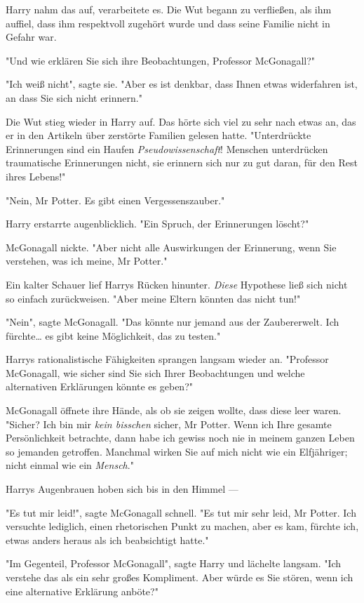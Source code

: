 {Harry nahm das auf, verarbeitete es. Die Wut begann zu verfließen, als ihm auffiel, dass ihm respektvoll zugehört wurde und dass seine Familie nicht in Gefahr war.

"Und wie erklären Sie sich ihre Beobachtungen, Professor McGonagall?"

"Ich weiß nicht", sagte sie. "Aber es ist denkbar, dass Ihnen etwas widerfahren ist, an dass Sie sich nicht erinnern."

Die Wut stieg wieder in Harry auf. Das hörte sich viel zu sehr nach etwas an, das er in den Artikeln über zerstörte Familien gelesen hatte. "Unterdrückte Erinnerungen sind ein Haufen \emph{Pseudowissenschaft}! Menschen unterdrücken traumatische Erinnerungen nicht, sie erinnern sich nur zu gut daran, für den Rest ihres Lebens!"

"Nein, Mr Potter. Es gibt einen Vergessenszauber."

Harry erstarrte augenblicklich. "Ein Spruch, der Erinnerungen löscht?"

McGonagall nickte. "Aber nicht alle Auswirkungen der Erinnerung, wenn Sie verstehen, was ich meine, Mr Potter."

Ein kalter Schauer lief Harrys Rücken hinunter. \emph{Diese} Hypothese ließ sich nicht so einfach zurückweisen. "Aber meine Eltern könnten das nicht tun!"

"Nein", sagte McGonagall. "Das könnte nur jemand aus der Zaubererwelt. Ich fürchte… es gibt keine Möglichkeit, das zu testen."

Harrys rationalistische Fähigkeiten sprangen langsam wieder an. "Professor McGonagall, wie sicher sind Sie sich Ihrer Beobachtungen und welche alternativen Erklärungen könnte es geben?"

McGonagall öffnete ihre Hände, als ob sie zeigen wollte, dass diese leer waren. "Sicher? Ich bin mir \emph{kein bisschen} sicher, Mr Potter. Wenn ich Ihre gesamte Persönlichkeit betrachte, dann habe ich gewiss noch nie in meinem ganzen Leben so jemanden getroffen. Manchmal wirken Sie auf mich nicht wie ein Elfjähriger; nicht einmal wie ein \emph{Mensch}."

Harrys Augenbrauen hoben sich bis in den Himmel ---

"Es tut mir leid!", sagte McGonagall schnell. "Es tut mir sehr leid, Mr Potter. Ich versuchte lediglich, einen rhetorischen Punkt zu machen, aber es kam, fürchte ich, etwas anders heraus als ich beabsichtigt hatte."

"Im Gegenteil, Professor McGonagall", sagte Harry und lächelte langsam. "Ich verstehe das als ein sehr großes Kompliment. Aber würde es Sie stören, wenn ich eine alternative Erklärung anböte?"

}
